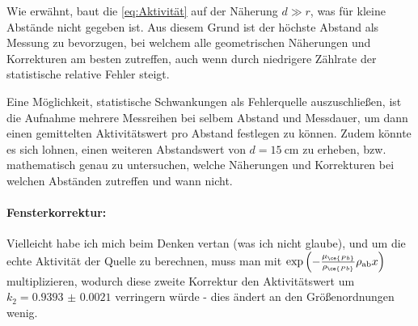 Wie erwähnt, baut die \cref{eq:Aktivität} auf der Näherung \(d\gg r\), was für kleine Abstände nicht gegeben ist. Aus diesem Grund ist der höchste Abstand als Messung zu bevorzugen, bei welchem alle geometrischen Näherungen und Korrekturen am besten zutreffen, auch wenn durch niedrigere Zählrate der statistische relative Fehler steigt.

Eine Möglichkeit, statistische Schwankungen als Fehlerquelle auszuschließen, ist die Aufnahme mehrere Messreihen bei selbem Abstand und Messdauer, um dann einen gemittelten Aktivitätswert pro Abstand festlegen zu können. Zudem könnte es sich lohnen, einen weiteren Abstandswert von \(d=\qty{15}{\cm}\) zu erheben, bzw. mathematisch genau zu untersuchen, welche Näherungen und Korrekturen bei welchen Abständen zutreffen und wann nicht. 

\paragraph{Fensterkorrektur:} Vielleicht habe ich mich beim Denken vertan (was ich nicht glaube), und um die echte Aktivität der Quelle zu berechnen, muss man mit \(\exp\left(-\frac{\mu_{\ce{Pb}}}{\rho_{\ce{Pb}}}\rho_{\text{ab}}x\right)\) multiplizieren, wodurch diese zweite Korrektur den Aktivitätswert um \(k_2=\num{0.9393(21)}\) verringern würde - dies ändert an den Größenordnungen wenig.

